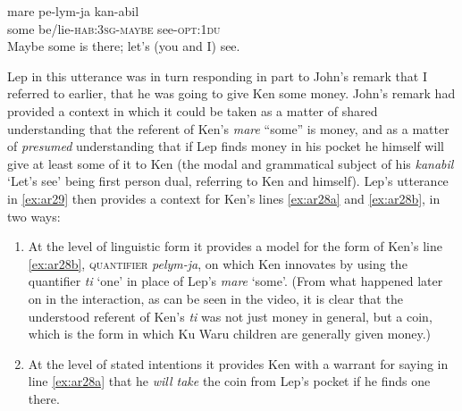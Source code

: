 \documentclass[output=paper]{langsci/langscibook}
\begin{document}
\begin{exe}
	\ex \label{ex:ar29}
	\gll mare pe-lym-ja kan-abil\\
	some be/lie-\textsc{hab}:3\textsc{sg}-\textsc{maybe} see-\textsc{opt}:1\textsc{du}\\
	\trans Maybe some is there; let’s (you and I) see.
\end{exe}

Lep in this utterance was in turn responding in part to John’s remark that I referred to earlier, that he was going to give Ken some money. John’s remark had provided a context in which it could be taken as a matter of shared understanding that the referent of Ken’s \emph{mare} “some” is money, and as a matter of \emph{presumed} understanding that if Lep finds money in his pocket he himself will give at least some of it to Ken (the modal and grammatical subject of his \textit{kanabil} ‘Let’s see’ being first person dual, referring to Ken and himself). Lep’s utterance in \ref{ex:ar29} then provides a context for Ken’s lines \ref{ex:ar28a} and \ref{ex:ar28b}, in two ways:

\begin{enumerate}[label=\arabic*)]
	\item At the level of linguistic form it provides a model for the form of Ken’s line \ref{ex:ar28b}, \textsc{quantifier} \textit{pelym-ja}, on which Ken innovates by using the quantifier \textit{ti} ‘one’ in place of Lep’s \textit{mare} ‘some’. (From what happened later on in the interaction, as can be seen in the video, it is clear that the understood referent of Ken’s \textit{ti} was not just money in general, but a coin, which is the form in which Ku Waru children are generally given money.)
	\item At the level of stated intentions it provides Ken with a warrant for saying in line \ref{ex:ar28a} that he \emph{will take} the coin from Lep’s pocket if he finds one there.
\end{enumerate}
\end{document}
